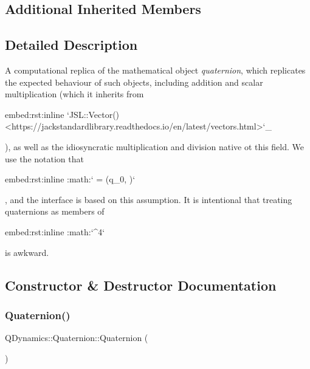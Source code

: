 \subsection*{Additional Inherited Members}


\subsection{Detailed Description}
A computational replica of the mathematical object {\itshape quaternion}, which replicates the expected behaviour of such objects, including addition and scalar multiplication (which it inherits from\begin{DoxyVerb}embed:rst:inline
`JSL::Vector() <https://jackstandardlibrary.readthedocs.io/en/latest/vectors.html>`_ \end{DoxyVerb}
 ), as well as the idiosyncratic multiplication and division native ot this field. We use the notation that\begin{DoxyVerb}embed:rst:inline :math:` = (q_0, )` \end{DoxyVerb}
 , and the interface is based on this assumption. It is intentional that treating quaternions as members of\begin{DoxyVerb}embed:rst:inline :math:`^4` \end{DoxyVerb}
 is awkward. 

\subsection{Constructor \& Destructor Documentation}
\mbox{\label{classQDynamics_1_1Quaternion_addca2bd1d2288c6875eab9f7b4c60881}} 
\subsubsection{\texorpdfstring{Quaternion()}{Quaternion()}\hspace{0.1cm}{\footnotesize\ttfamily [1/5]}}
{\footnotesize\ttfamily Q\+Dynamics\+::\+Quaternion\+::\+Quaternion (\begin{DoxyParamCaption}{ }\end{DoxyParamCaption})\hspace{0.3cm}{\ttfamily [inline]}}



